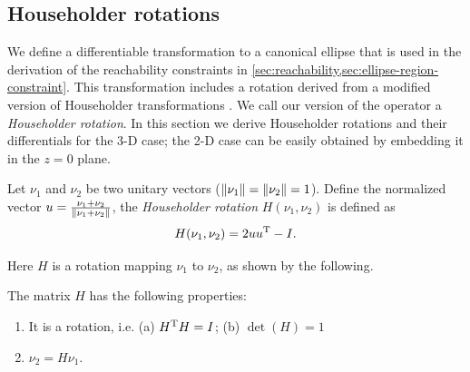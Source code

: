 \documentclass[10pt,twocolumn,twoside]{IEEEtran}
\newcommand{\news}{\color{blue}}
\begin{document}
\subsection{Householder rotations}\label{sec:householder}
We define a differentiable transformation to a canonical ellipse that is used in the derivation of the reachability constraints in \cref{sec:reachability,sec:ellipse-region-constraint}. This transformation includes a rotation derived from a modified version of Householder transformations \cite{householder1958unitary}. 
We call our version of the operator a \emph{Householder rotation}. In this section we derive Householder rotations and their differentials for the 3-D case; the 2-D case can be easily obtained by embedding it in the $z=0$ plane.
\begin{definition} Let $\nu_1$ and $\nu_2$ be two unitary vectors ($\lVert\nu_1\rVert=\lVert\nu_2\rVert=1$). Define the normalized vector $u = \frac{\nu_1+\nu_2}{\lVert\nu_1+\nu_2\rVert}$,
the \emph{Householder rotation} $H(\nu_1,\nu_2)$ is defined as
  \begin{equation}\label{eq:H definition}
    H(\nu_1,\nu_2) = 2 u u^\mathrm{T}-I.
  \end{equation}
\end{definition}
Here $H$ is a rotation mapping $\nu_1$ to $\nu_2$, as shown by the following.
\begin{proposition}\label{prop:HProperty}
 {\news The matrix $H$ has the following properties:
  \begin{enumerate}
  \item\label{it:rotation} It is a rotation, i.e. (a) $H^\mathrm{T} H=I$; (b) $\det(H)=1$
  \item\label{it:transformation} $\nu_2=H \nu_1$.
  \end{enumerate}}
\end{proposition}
\end{document}
